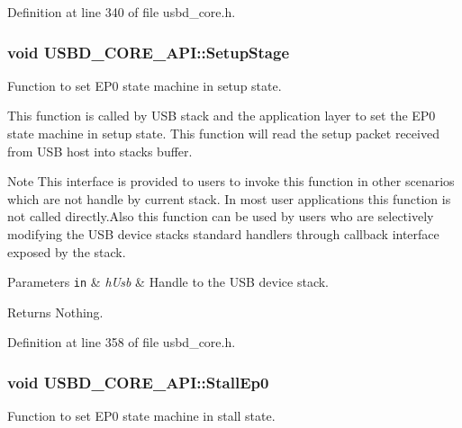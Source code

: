 Definition at line 340 of file usbd\+\_\+core.\+h.

\subsubsection[{\texorpdfstring{Setup\+Stage}{SetupStage}}]{\setlength{\rightskip}{0pt plus 5cm}void U\+S\+B\+D\+\_\+\+C\+O\+R\+E\+\_\+\+A\+P\+I\+::\+Setup\+Stage}\hypertarget{structUSBD__CORE__API_abf9196752dcf110a13c44a14b368e4be}{}\label{structUSBD__CORE__API_abf9196752dcf110a13c44a14b368e4be}
Function to set E\+P0 state machine in setup state.

This function is called by U\+SB stack and the application layer to set the E\+P0 state machine in setup state. This function will read the setup packet received from U\+SB host into stack\textquotesingle{}s buffer. ~\newline
\begin{DoxyNote}{Note}
This interface is provided to users to invoke this function in other scenarios which are not handle by current stack. In most user applications this function is not called directly.\+Also this function can be used by users who are selectively modifying the U\+SB device stack\textquotesingle{}s standard handlers through callback interface exposed by the stack.
\end{DoxyNote}

\begin{DoxyParams}[1]{Parameters}
\mbox{\tt in}  & {\em h\+Usb} & Handle to the U\+SB device stack. \\
\hline
\end{DoxyParams}
\begin{DoxyReturn}{Returns}
Nothing. 
\end{DoxyReturn}


Definition at line 358 of file usbd\+\_\+core.\+h.

\subsubsection[{\texorpdfstring{Stall\+Ep0}{StallEp0}}]{\setlength{\rightskip}{0pt plus 5cm}void U\+S\+B\+D\+\_\+\+C\+O\+R\+E\+\_\+\+A\+P\+I\+::\+Stall\+Ep0}\hypertarget{structUSBD__CORE__API_a8ee40b044bb1327607dbb4185b2b7c93}{}\label{structUSBD__CORE__API_a8ee40b044bb1327607dbb4185b2b7c93}
Function to set E\+P0 state machine in stall state.

